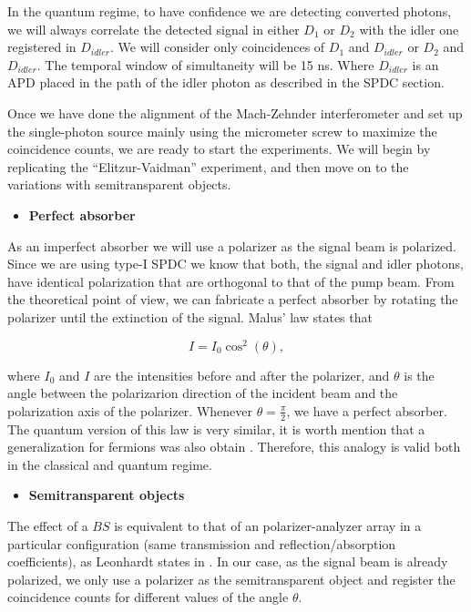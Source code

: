 \documentclass[12pt]{book}
\begin{document}
 In the quantum regime, to have confidence we are detecting converted photons, we will always correlate the detected signal in either $D_{1}$ or $D_{2}$ with the idler one registered in $D_{idler}$. We will consider only coincidences of $D_{1}$ and $D_{idler}$ or $D_{2}$ and $D_{idler}$. The temporal window of simultaneity will be 15 ns. Where $D_{idler}$ is an APD placed in the path of the idler photon as described in the SPDC section.




Once we have done the alignment of the Mach-Zehnder interferometer and set up the single-photon source mainly using the micrometer screw to maximize the coincidence counts, we are ready to start the experiments. We will begin by replicating the ``Elitzur-Vaidman'' experiment, and then move on to the variations with semitransparent objects.


\begin{itemize}
\item {\large \textbf{Perfect absorber}}
\end{itemize}
As an imperfect absorber we will use a polarizer as the signal beam is polarized. Since we are using type-I SPDC we know that both, the signal and idler photons, have identical polarization that are orthogonal to that of the pump beam. From the theoretical point of view, we can fabricate a perfect absorber by rotating the polarizer until the extinction of the signal. Malus' law states that \cite{hecht}

\begin{equation}
I=I_{0} \cos^{2}(\theta),
\end{equation}

where $I_{0}$ and $I$ are the intensities before and after the polarizer, and $\theta$ is the angle between the polarizarion direction of the incident beam and the polarization axis of the polarizer. Whenever $\theta = \frac{\pi}{2}$, we have a perfect absorber. The quantum version of this law is very similar, it is worth mention that a generalization for fermions was also obtain \cite{malus}. Therefore, this analogy is valid both in the classical and quantum regime. 



 \begin{itemize}
\item {\large \textbf{Semitransparent objects}}
\end{itemize}

The effect of a $BS$ is equivalent to that of an polarizer-analyzer array in a particular configuration (same transmission and reflection/absorption coefficients), as Leonhardt states in \cite{nosirve}. In our case, as the signal beam is already polarized, we only use a polarizer as the semitransparent object and register the coincidence counts for different values of the angle $\theta$.
\end{document}
